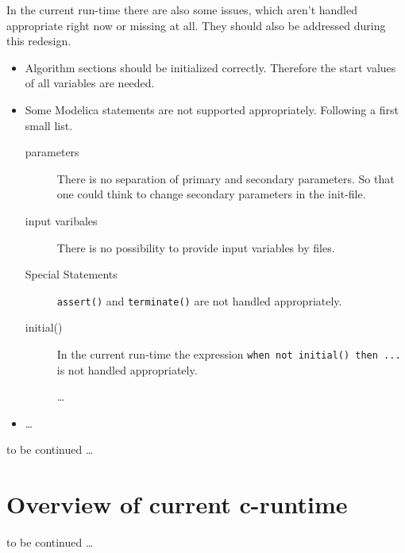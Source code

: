 In the current run-time there are also some issues, which aren't handled
appropriate right now or missing at all. They should also be addressed during
this redesign.
\begin{itemize}
  \item Algorithm sections should be initialized correctly. Therefore the start
  values of all variables are needed.
  \item Some Modelica statements are not supported appropriately.
  Following a first small list.
  \begin{description}
     \item[parameters] There is no separation of primary and secondary
     parameters. So that one could think to change secondary parameters in
     the init-file.
     \item[input varibales] There is no possibility to provide input variables
     by files.
     \item[Special Statements] \lstinline{assert()} and \lstinline{terminate()} are not handled
     appropriately. \\
     \item[initial()] In the current run-time the expression
     \lstinline{when not initial() then ... } is not handled appropriately.
     \item[] \ldots
   \end{description}
   \item \ldots
\end{itemize}

to be continued \ldots

\section{Overview of current c-runtime}

to be continued \ldots

%


